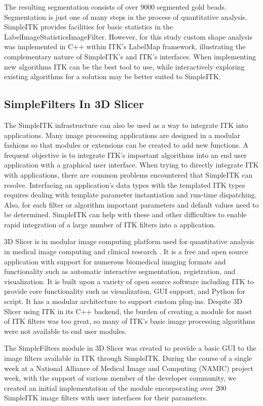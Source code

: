 \documentclass{frontiersMED} %
\begin{document}
The resulting segmentation consists of over 9000 segmented gold
beads. Segmentation is just one of many steps in the process of
quantitative analysis. SimpleITK provides facilities for basic
statistics in the LabelImageStatisticsImageFilter. However, for this
study custom shape analysis was implemented in C++
within ITK's LabelMap framework, illustrating the complementary
nature of SimpleITK's and ITK's interfaces. When implementing new
algorithms ITK can be the best tool to use, while interactively
exploring existing algorithms for a solution may be better suited to
SimpleITK.

\subsection{SimpleFilters In 3D Slicer}
The SimpleITK infrastructure can also be used as a way to integrate
ITK into applications. Many image processing applications are designed
in a modular fashions so that modules or extensions can be created to
add new functions. A frequent objective is to integrate ITK's
important algorithms into an end user application with a graphical
user interface. When trying to directly integrate ITK with
applications, there are common problems encountered that SimpleITK can
resolve.  Interfacing an application's data types with
the templated ITK types requires dealing with template parameter
instantiation and run-time dispatching. Also, for each filter or algorithm
important parameters and default values need to be
determined. SimpleITK can help with these and other difficulties to
enable rapid integration of a large number of ITK filters into a
application.

3D Slicer is in modular image computing platform used for quantitative
analysis in medical image computing and clinical research
\cite{Fedorov2012}. It is a free and open source application with support
for numerous biomedical imaging formats and functionality such as
automatic interactive segmentation, registration, and
visualization. It is built upon a variety of open source software
including ITK to provide core functionality such as visualization, GUI
support, and Python for script. It has a modular
architecture to support custom plug-ins. Despite 3D Slicer using ITK
in its C++ backend, the burden of creating a module for most of ITK
filters was too great, so many of ITK's basic image processing algorithms
were not available to end user modules.

The SimpleFilters module in 3D Slicer was created to provide a basic
GUI to the image filters available in ITK through SimpleITK. During
the course of a single week at a National Alliance of Medical Image
and Computing (NAMIC) project week, with the support of various member
of the developer community, we created an initial implementation of the module
encorporating over 200 SimpleITK image filters with user interfaces
for their parameters.
\end{document}
